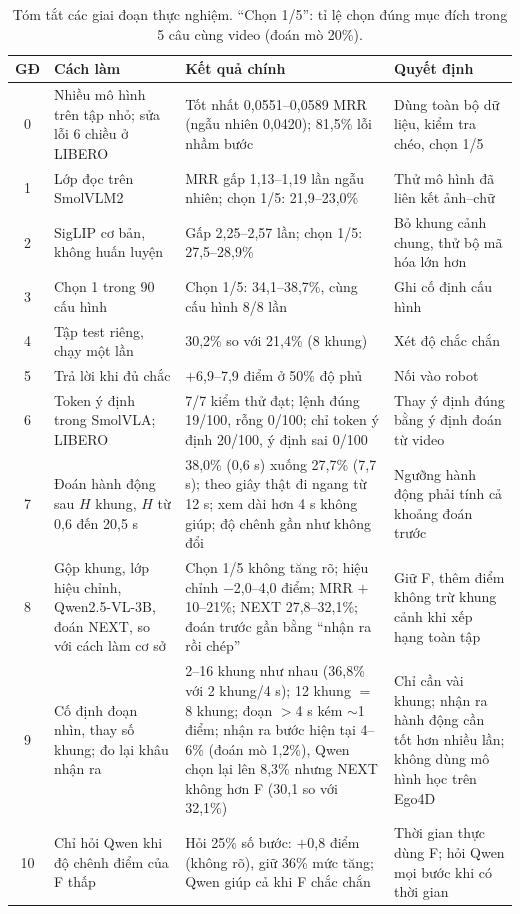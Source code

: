 \documentclass[a4paper,oneside]{report}
\begin{document}
\begin{table}[ht]
\centering
\caption{Tóm tắt các giai đoạn thực nghiệm. ``Chọn 1/5'': tỉ lệ chọn đúng mục đích trong 5 câu cùng video (đoán mò 20\%).}
\label{tab:summary}
\small
\begin{tabularx}{\linewidth}{c >{\raggedright}p{3.6cm} >{\raggedright}p{3.6cm} X}
\toprule
GĐ & Cách làm & Kết quả chính & Quyết định \\
\midrule
0 & Nhiều mô hình trên tập nhỏ; sửa lỗi 6 chiều ở LIBERO & Tốt nhất 0,0551--0,0589 MRR (ngẫu nhiên 0,0420); 81,5\% lỗi nhầm bước & Dùng toàn bộ dữ liệu, kiểm tra chéo, chọn 1/5 \\
1 & Lớp đọc trên SmolVLM2 & MRR gấp 1,13--1,19 lần ngẫu nhiên; chọn 1/5: 21,9--23,0\% & Thử mô hình đã liên kết ảnh--chữ \\
2 & SigLIP cơ bản, không huấn luyện & Gấp 2,25--2,57 lần; chọn 1/5: 27,5--28,9\% & Bỏ khung cảnh chung, thử bộ mã hóa lớn hơn \\
3 & Chọn 1 trong 90 cấu hình & Chọn 1/5: 34,1--38,7\%, cùng cấu hình 8/8 lần & Ghi cố định cấu hình \\
4 & Tập test riêng, chạy một lần & 30,2\% so với 21,4\% (8 khung) & Xét độ chắc chắn \\
5 & Trả lời khi đủ chắc & $+$6,9--7,9 điểm ở 50\% độ phủ & Nối vào robot \\
6 & Token ý định trong SmolVLA; LIBERO & 7/7 kiểm thử đạt; lệnh đúng 19/100, rỗng 0/100; chỉ token ý định 20/100, ý định sai 0/100 & Thay ý định đúng bằng ý định đoán từ video \\
7 & Đoán hành động sau $H$ khung, $H$ từ 0,6 đến 20,5 s & 38,0\% (0,6 s) xuống 27,7\% (7,7 s); theo giây thật đi ngang từ 12 s; xem dài hơn 4 s không giúp; độ chênh gần như không đổi & Ngưỡng hành động phải tính cả khoảng đoán trước \\
8 & Gộp khung, lớp hiệu chỉnh, Qwen2.5-VL-3B, đoán NEXT, so với cách làm cơ sở & Chọn 1/5 không tăng rõ; hiệu chỉnh $-$2,0--4,0 điểm; MRR $+$10--21\%; NEXT 27,8--32,1\%; đoán trước gần bằng ``nhận ra rồi chép'' & Giữ F, thêm điểm không trừ khung cảnh khi xếp hạng toàn tập \\
9 & Cố định đoạn nhìn, thay số khung; đo lại khâu nhận ra & 2--16 khung như nhau (36,8\% với 2 khung/4 s); 12 khung $=$ 8 khung; đoạn $>$4 s kém $\sim$1 điểm; nhận ra bước hiện tại 4--6\% (đoán mò 1,2\%), Qwen chọn lại lên 8,3\% nhưng NEXT không hơn F (30,1 so với 32,1\%) & Chỉ cần vài khung; nhận ra hành động cần tốt hơn nhiều lần; không dùng mô hình học trên Ego4D \\
10 & Chỉ hỏi Qwen khi độ chênh điểm của F thấp & Hỏi 25\% số bước: $+$0,8 điểm (không rõ), giữ 36\% mức tăng; Qwen giúp cả khi F chắc chắn & Thời gian thực dùng F; hỏi Qwen mọi bước khi có thời gian \\
\bottomrule
\end{tabularx}
\end{table}
\end{document}

